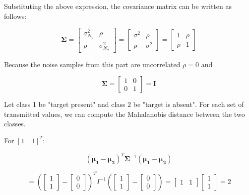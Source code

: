 \documentclass[fleqn]{article}
\begin{document}
\begin{enumerate}
\begin{enumerate}
			Substituting the above expression, the covariance matrix can be written as follows:
			
			\begin{equation*}
				\mathbf{\Sigma} = \begin{bmatrix}
					\sigma_{N_1}^2 & \rho \\
					\rho & \sigma_{N_2}^2
				\end{bmatrix} = \begin{bmatrix}
					\sigma^2 & \rho \\
					\rho & \sigma^2
				\end{bmatrix} = \begin{bmatrix}
					1 & \rho \\
					\rho & 1
				\end{bmatrix}
			\end{equation*}
			
			Because the noise samples from this part are uncorrelated $\rho = 0$ and
			
			\begin{equation*}
				\mathbf{\Sigma} = \begin{bmatrix}
					1 & 0 \\
					0 & 1
				\end{bmatrix} = \mathbf{I}
			\end{equation*}
			
			Let class 1 be "target present" and class 2 be "target is absent". For each set of transmitted values, we can compute the Mahalanobis distance between the two classes.
			
			For $[1 \quad 1]^T$:
			
			\begin{equation*}
				(\mathbf{\mu_1} - \mathbf{\mu_2})^T\mathbf{\Sigma}^{-1}(\mathbf{\mu_1} - \mathbf{\mu_2})
			\end{equation*}
			
			\begin{equation*}
				= \left(\begin{bmatrix} 1 \\ 1 \end{bmatrix} - \begin{bmatrix} 0 \\ 0 \end{bmatrix}\right)^TI^{-1}\left(\begin{bmatrix} 1 \\ 1 \end{bmatrix} - \begin{bmatrix} 0 \\ 0 \end{bmatrix}\right) = \begin{bmatrix} 1 & 1 \end{bmatrix}\begin{bmatrix} 1 \\ 1 \end{bmatrix} = 2
			\end{equation*}
			

\end{enumerate}
\end{enumerate}
\end{document}
